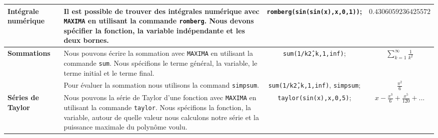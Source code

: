 \documentclass[8pt,landscape]{article}
\begin{document}
\begin{center}
\begin{longtable}{@{}p{4cm}p{10cm}cc@{}}
\midrule

\textbf{Intégrale numérique} & Il est possible de trouver des intégrales numérique avec \texttt{MAXIMA} en utilisant la commande \texttt{romberg}. Nous devons spécifier la fonction, la variable indépendante et les deux bornes. & \texttt{romberg(sin(sin(x),x,0,1))}; & $0.4306059236425572$ \\

\midrule

\multirow{2}{4cm}{\textbf{Sommations}} & Nous pouvons écrire la sommation avec \texttt{MAXIMA} en utilisant la commande \texttt{sum}. Nous spécifions le terme général, la variable, le terme initial et le terme final. & \texttt{sum(1/k\^2,k,1,inf)}; & $\sum\limits_{k=1}^{\infty} \frac{1}{k^2}$ \\
& Pour évaluer la sommation nous utilisons la command \texttt{simpsum}. & \texttt{sum(1/k\^2,k,1,inf)}, \texttt{simpsum}; & $\frac{\pi^2}{6}$ \\

\midrule

\textbf{Séries de Taylor} & Nous pouvons la série de Taylor d'une fonction avec \texttt{MAXIMA} en utilisant la commande \texttt{taylor}. Nous spécifions la fonction, la variable, autour de quelle valeur nous calculons notre série et la puissance maximale du polynôme voulu. & \texttt{taylor(sin(x),x,0,5)}; & $x-\frac{{{x}^{3}}}{6}+\frac{{{x}^{5}}}{120}+\mbox{...}$ \\

\bottomrule
\end{longtable}
\end{center}
\end{document}
